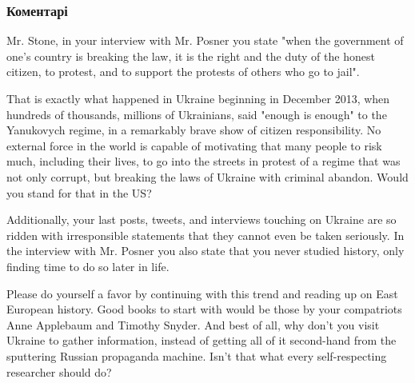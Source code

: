  
 
 
 
 
\subsubsection{Коментарі}

\begin{itemize} %


Mr. Stone, in your interview with Mr. Posner you state "when the government of
one's country is breaking the law, it is the right and the duty of the honest
citizen, to protest, and to support the protests of others who go to jail".

That is exactly what happened in Ukraine beginning in December 2013, when
hundreds of thousands, millions of Ukrainians, said "enough is enough" to the
Yanukovych regime, in a remarkably brave show of citizen responsibility. No
external force in the world is capable of motivating that many people to risk
much, including their lives, to go into the streets in protest of a regime that
was not only corrupt, but breaking the laws of Ukraine with criminal abandon.
Would you stand for that in the US? 

Additionally, your last posts, tweets, and interviews touching on Ukraine are
so ridden with irresponsible statements that they cannot even be taken
seriously. In the interview with Mr. Posner you also state that you never
studied history, only finding time to do so later in life.

Please do yourself a favor by continuing with this trend and reading up on East
European history. Good books to start with would be those by your compatriots
Anne Applebaum and Timothy Snyder. And best of all, why don't you visit Ukraine
to gather information, instead of getting all of it second-hand from the
sputtering Russian propaganda machine. Isn't that what every self-respecting
researcher should do?

\begin{itemize} %


\end{itemize}
\end{itemize}
